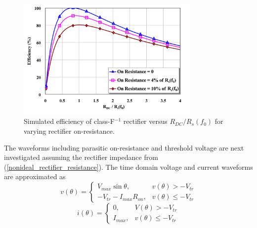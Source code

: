 \documentclass[journal]{IEEEtran}
\begin{document}
%

\begin{figure}[!b]
  \begin{center}
  \includegraphics[width=3.5in]{pdf/04.pdf}
  \caption{Simulated efficiency of class-F$^{-1}$ rectifier versus $R_{DC} / R_s(f_0)$ for varying rectifier on-resistance.}\label{sim_opt_eff_classFinv}
  \end{center}
\end{figure}

The waveforms including parasitic on-resistance and threshold voltage are next investigated assuming the rectifier impedance from (\ref{nonideal_rectifier_resistance}). The time domain voltage and current waveforms are approximated as
\begin{equation}\label{diode_voltage_waveform_finv_par}
v(\theta) =
\begin{cases}
    V_{max}\sin\theta, & v(\theta) > -V_{tr}\\
    -V_{tr} - I_{max}R_{on}, & v(\theta) \leq -V_{tr}
\end{cases}
\end{equation}
\begin{equation}\label{diode_current_waveform_finv_par}
i(\theta) =
\begin{cases}
    0, & V(\theta) > -V_{tr}\\
    I_{max}, & v(\theta) \leq -V_{tr}
\end{cases}
\end{equation}
\end{document}
